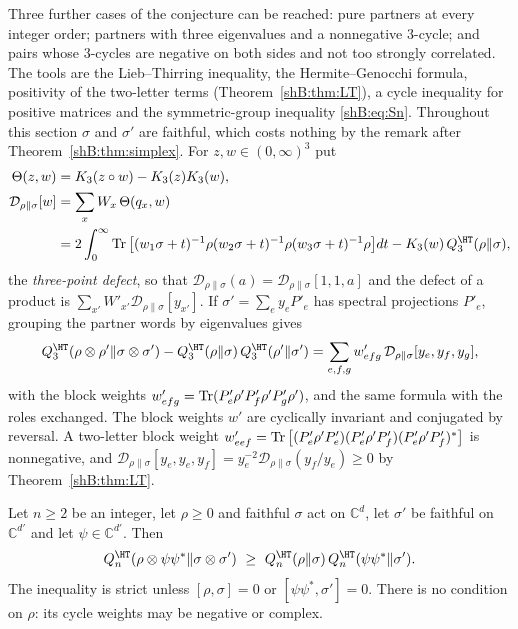 Three further cases of the conjecture can be reached: pure partners at every integer order; partners with three eigenvalues and a nonnegative $3$-cycle; and pairs whose $3$-cycles are negative on both sides and not too strongly correlated. The tools are the Lieb--Thirring inequality, the Hermite--Genocchi formula, positivity of the two-letter terms (Theorem~\ref{shB:thm:LT}), a cycle inequality for positive matrices and the symmetric-group inequality \eqref{shB:eq:Sn}. Throughout this section $\sigma$ and $\sigma'$ are faithful, which costs nothing by the remark after Theorem~\ref{shB:thm:simplex}. For $z,w\in(0,\infty)^3$ put
\[
\begin{aligned}
\Theta(z,w)&=K_3(z\circ w)-K_3(z)K_3(w),\\
\mathcal D_{\rho\|\sigma}[w]&=\sum_xW_x\,\Theta(q_x,w)\\
&=2\int_0^\infty\Tr\big[(w_1\sigma+t)^{-1}\rho(w_2\sigma+t)^{-1}\rho(w_3\sigma+t)^{-1}\rho\big]dt-K_3(w)\,Q^\HT_3(\rho\|\sigma),
\end{aligned}
\]
the \emph{three-point defect}, so that $\mathcal D_{\rho\|\sigma}(a)=\mathcal D_{\rho\|\sigma}[1,1,a]$ and the defect of a product is $\sum_{x'}W'_{x'}\mathcal D_{\rho\|\sigma}[y_{x'}]$. If $\sigma'=\sum_ey_eP'_e$ has spectral projections $P'_e$, grouping the partner words by eigenvalues gives
\begin{equation}\label{shB:eq:blockdefect}
Q^\HT_3(\rho\otimes\rho'\|\sigma\otimes\sigma')-Q^\HT_3(\rho\|\sigma)\,Q^\HT_3(\rho'\|\sigma')=\sum_{e,f,g}w'_{efg}\,\mathcal D_{\rho\|\sigma}[y_e,y_f,y_g],
\end{equation}
with the block weights $w'_{efg}=\operatorname{Tr}(P'_e\rho'P'_f\rho'P'_g\rho')$, and the same formula with the roles exchanged. The block weights $w'$ are cyclically invariant and conjugated by reversal. A two-letter block weight $w'_{eef}=\operatorname{Tr}\big[(P'_e\rho'P'_e)(P'_e\rho'P'_f)(P'_e\rho'P'_f)^*\big]$ is nonnegative, and $\mathcal D_{\rho\|\sigma}[y_e,y_e,y_f]=y_e^{-2}\mathcal D_{\rho\|\sigma}(y_f/y_e)\ge0$ by Theorem~\ref{shB:thm:LT}.

\begin{theorem}\label{shB:thm:purepartner}
Let $n\ge2$ be an integer, let $\rho\ge0$ and faithful $\sigma$ act on $\mathbb C^d$, let $\sigma'$ be faithful on $\mathbb C^{d'}$ and let $\psi\in\mathbb C^{d'}$. Then
\[
Q^\HT_n(\rho\otimes\psi\psi^*\|\sigma\otimes\sigma')\ \ge\ Q^\HT_n(\rho\|\sigma)\,Q^\HT_n(\psi\psi^*\|\sigma').
\]
The inequality is strict unless $[\rho,\sigma]=0$ or $[\psi\psi^*,\sigma']=0$. There is no condition on $\rho$: its cycle weights may be negative or complex.
\end{theorem}

